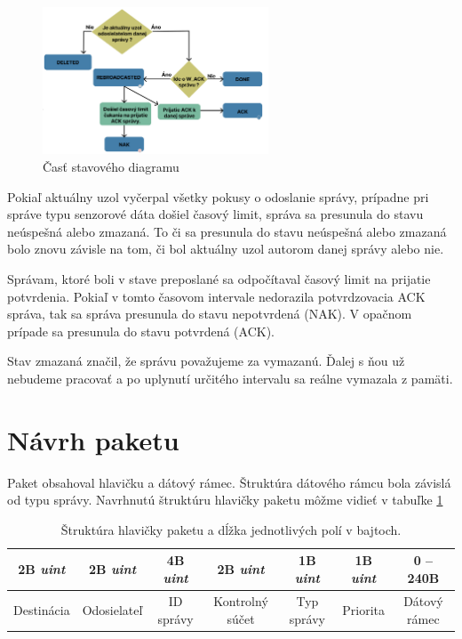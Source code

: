 \documentclass[slovak,master]{diploma}
\begin{document}
\begin{figure}[h!]
	\centering
	\includegraphics[width=0.6\textwidth]{Figures/state_flow_Min.png}
	\caption{Časť stavového diagramu}
	\label{fig:stateFlowMin}
\end{figure}

Pokiaľ aktuálny uzol vyčerpal všetky pokusy o odoslanie správy, prípadne pri správe typu senzorové dáta došiel časový limit, správa sa presunula do stavu neúspešná alebo zmazaná.
To či sa presunula do stavu neúspešná alebo zmazaná bolo znovu závisle na tom, či bol aktuálny uzol autorom danej správy alebo nie.

Správam, ktoré boli v stave preposlané sa odpočítaval časový limit na prijatie potvrdenia. Pokiaľ v tomto časovom intervale nedorazila potvrdzovacia ACK správa, tak sa 
správa presunula do stavu nepotvrdená (NAK). V opačnom prípade sa presunula do stavu potvrdená (ACK).

Stav zmazaná značil, že správu považujeme za vymazanú. Ďalej s ňou už nebudeme pracovať a po uplynutí určitého intervalu sa reálne vymazala z pamäti.


\section{Návrh paketu}
Paket obsahoval hlavičku a dátový rámec. Štruktúra dátového rámcu bola závislá od typu správy.
Navrhnutú štruktúru hlavičky paketu môžme vidieť v tabuľke \ref{tab:packetHeader}

\begin{table}[!h]
	\centering
  \caption{Štruktúra hlavičky paketu a dĺžka jednotlivých polí v bajtoch.}
  \begin{tabular}{|c|c|c|c|c|c|c|}
    \toprule
    2B \emph{uint} & 2B \emph{uint} & 4B \emph{uint} & 2B \emph{uint} & 1B \emph{uint} & 1B \emph{uint} & 0 -- 240B \\
    \midrule
    Destinácia & Odosielateľ & ID správy & Kontrolný súčet & Typ správy & Priorita & Dátový rámec \\
    \midrule
  \end{tabular}
  \label{tab:packetHeader}
\end{table}
\end{document}
